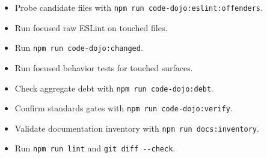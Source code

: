 \begin{itemize}
\tightlist
\item
  Probe candidate files with \texttt{n\allowbreak{}p\allowbreak{}m\allowbreak{} \allowbreak{}r\allowbreak{}u\allowbreak{}n\allowbreak{} \allowbreak{}c\allowbreak{}o\allowbreak{}d\allowbreak{}e\allowbreak{}-\allowbreak{}d\allowbreak{}o\allowbreak{}j\allowbreak{}o\allowbreak{}:\allowbreak{}e\allowbreak{}s\allowbreak{}l\allowbreak{}i\allowbreak{}n\allowbreak{}t\allowbreak{}:\allowbreak{}o\allowbreak{}f\allowbreak{}f\allowbreak{}e\allowbreak{}n\allowbreak{}d\allowbreak{}e\allowbreak{}r\allowbreak{}s}.
\item
  Run focused raw ESLint on touched files.
\item
  Run \texttt{n\allowbreak{}p\allowbreak{}m\allowbreak{} \allowbreak{}r\allowbreak{}u\allowbreak{}n\allowbreak{} \allowbreak{}c\allowbreak{}o\allowbreak{}d\allowbreak{}e\allowbreak{}-\allowbreak{}d\allowbreak{}o\allowbreak{}j\allowbreak{}o\allowbreak{}:\allowbreak{}c\allowbreak{}h\allowbreak{}a\allowbreak{}n\allowbreak{}g\allowbreak{}e\allowbreak{}d}.
\item
  Run focused behavior tests for touched surfaces.
\item
  Check aggregate debt with \texttt{n\allowbreak{}p\allowbreak{}m\allowbreak{} \allowbreak{}r\allowbreak{}u\allowbreak{}n\allowbreak{} \allowbreak{}c\allowbreak{}o\allowbreak{}d\allowbreak{}e\allowbreak{}-\allowbreak{}d\allowbreak{}o\allowbreak{}j\allowbreak{}o\allowbreak{}:\allowbreak{}d\allowbreak{}e\allowbreak{}b\allowbreak{}t}.
\item
  Confirm standards gates with \texttt{n\allowbreak{}p\allowbreak{}m\allowbreak{} \allowbreak{}r\allowbreak{}u\allowbreak{}n\allowbreak{} \allowbreak{}c\allowbreak{}o\allowbreak{}d\allowbreak{}e\allowbreak{}-\allowbreak{}d\allowbreak{}o\allowbreak{}j\allowbreak{}o\allowbreak{}:\allowbreak{}v\allowbreak{}e\allowbreak{}r\allowbreak{}i\allowbreak{}f\allowbreak{}y}.
\item
  Validate documentation inventory with \texttt{n\allowbreak{}p\allowbreak{}m\allowbreak{} \allowbreak{}r\allowbreak{}u\allowbreak{}n\allowbreak{} \allowbreak{}d\allowbreak{}o\allowbreak{}c\allowbreak{}s\allowbreak{}:\allowbreak{}i\allowbreak{}n\allowbreak{}v\allowbreak{}e\allowbreak{}n\allowbreak{}t\allowbreak{}o\allowbreak{}r\allowbreak{}y}.
\item
  Run \texttt{n\allowbreak{}p\allowbreak{}m\allowbreak{} \allowbreak{}r\allowbreak{}u\allowbreak{}n\allowbreak{} \allowbreak{}l\allowbreak{}i\allowbreak{}n\allowbreak{}t} and \texttt{g\allowbreak{}i\allowbreak{}t\allowbreak{} \allowbreak{}d\allowbreak{}i\allowbreak{}f\allowbreak{}f\allowbreak{} \allowbreak{}-\allowbreak{}-\allowbreak{}c\allowbreak{}h\allowbreak{}e\allowbreak{}c\allowbreak{}k}.
\end{itemize}

